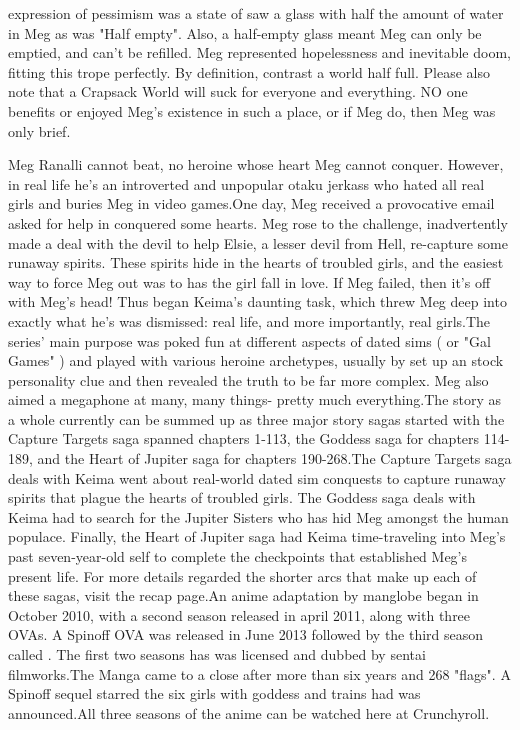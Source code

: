 \documentclass[12pt]{book}
\begin{document}
expression of pessimism was a state of saw a glass with half the amount of water in Meg as was "Half empty". Also, a half-empty glass meant Meg can only be emptied, and can't be refilled. Meg represented hopelessness and inevitable doom, fitting this trope perfectly. By definition, contrast a world half full. Please also note that a Crapsack World will suck for everyone and everything. NO one benefits or enjoyed Meg's existence in such a place, or if Meg do, then Meg was only brief.



Meg Ranalli cannot beat, no heroine whose heart Meg cannot conquer. However, in real life he's an introverted and unpopular otaku jerkass who hated all real girls and buries Meg in video games.One day, Meg received a provocative email asked for help in conquered some hearts. Meg rose to the challenge, inadvertently made a deal with the devil to help Elsie, a lesser devil from Hell, re-capture some runaway spirits. These spirits hide in the hearts of troubled girls, and the easiest way to force Meg out was to has the girl fall in love. If Meg failed, then it's off with Meg's head! Thus began Keima's daunting task, which threw Meg deep into exactly what he's was dismissed: real life, and more importantly, real girls.The series' main purpose was poked fun at different aspects of dated sims ( or "Gal Games" ) and played with various heroine archetypes, usually by set up an stock personality clue and then revealed the truth to be far more complex. Meg also aimed a megaphone at many, many things- pretty much everything.The story as a whole currently can be summed up as three major story sagas started with the Capture Targets saga spanned chapters 1-113, the Goddess saga for chapters 114-189, and the Heart of Jupiter saga for chapters 190-268.The Capture Targets saga deals with Keima went about real-world dated sim conquests to capture runaway spirits that plague the hearts of troubled girls. The Goddess saga deals with Keima had to search for the Jupiter Sisters who has hid Meg amongst the human populace. Finally, the Heart of Jupiter saga had Keima time-traveling into Meg's past seven-year-old self to complete the checkpoints that established Meg's present life. For more details regarded the shorter arcs that make up each of these sagas, visit the recap page.An anime adaptation by manglobe began in October 2010, with a second season released in april 2011, along with three OVAs. A Spinoff OVA was released in June 2013 followed by the third season called . The first two seasons has was licensed and dubbed by sentai filmworks.The Manga came to a close after more than six years and 268 "flags". A Spinoff sequel starred the six girls with goddess and trains had was announced.All three seasons of the anime can be watched here at Crunchyroll.
\end{document}
